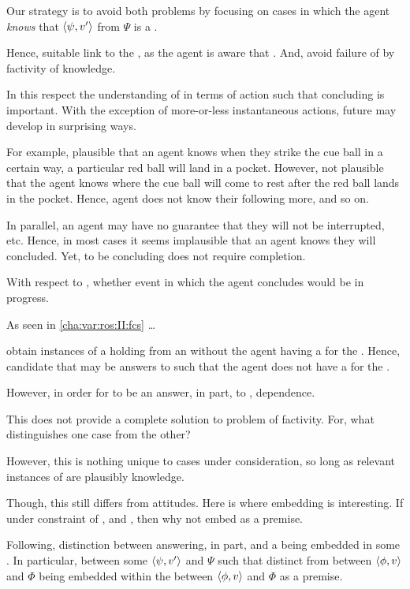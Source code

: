 \begin{note}
  Our strategy is to avoid both problems by focusing on cases in which the agent \emph{knows} that \(\langle \psi, v' \rangle\) from \(\Psi\) is a \fc{}.

  Hence, suitable link to the \agpe{}, as the agent is aware that \fc{}.
  And, avoid failure of \fc{} by factivity of knowledge.

  In this respect the understanding of  in terms of action such that concluding is important.
  With the exception of more-or-less instantaneous actions, future may develop in surprising ways.

  For example, plausible that an agent knows when they strike the cue ball in a certain way, a particular red ball will land in a pocket.
  However, not plausible that the agent knows where the cue ball will come to rest after the red ball lands in the pocket.
  Hence, agent does not know their following more, and so on.

  In parallel, an agent may have no guarantee that they will not be interrupted, etc.
  Hence, in most cases it seems implausible that an agent knows they will concluded.
  Yet, to be concluding does not require completion.

  With respect to \fc{}, whether event in which the agent concludes would be in progress.

  As seen in \autoref{cha:var:ros:II:fcs} \dots

   obtain instances of a  holding from an \agpe{} without the agent having a  for the .
  Hence, candidate \ros{} that may be answers to \qWhyVnP{} such that the agent does not have a  for the .

  However, in order for \ros{} to be an answer, in part, to \qWhyVnP{}, dependence.
\end{note}

\begin{note}
  This does not provide a complete solution to problem of factivity.
  For, what distinguishes one case from the other?

  However, this is nothing unique to cases under consideration, so long as relevant instances of \fc{} are plausibly knowledge.

  Though, this still differs from attitudes.
  Here is where embedding is interesting.
  If under constraint of \agpe{}, and \fc{}, then why not embed \fc{} as a premise.
\end{note}

\begin{note}
  Following, distinction between \ros{} answering, in part, \qWhyVnP{} and a \ros{} being embedded in some \ros{}.
  In particular, \ros{} between some \(\langle \psi, v' \rangle\) and \(\Psi\) such that distinct from \ros{} between \(\langle \phi, v \rangle\) and \(\Phi\) being embedded within the \ros{} between \(\langle \phi, v \rangle\) and \(\Phi\) as a premise.
\end{note}

